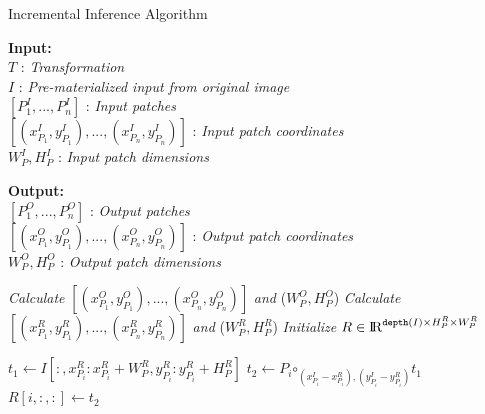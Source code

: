 \begin{algorithm}
    \caption{Incremental Inference Algorithm}\label{euclid}
    \begin{flushleft}
     \hspace*{4mm} \textbf{Input:} \\
     \hspace*{8mm} $T$ : \textit{Transformation}\\
     \hspace*{8mm} $I$ : \textit{Pre-materialized input from original image}\\
     \hspace*{8mm} $[P^I_1,...,P^I_n]$ : \textit{Input patches}\\
     \hspace*{8mm} $[(x^I_{P_1},y^I_{P_1}),...,(x^I_{P_n},y^I_{P_n})]$ : \textit{Input patch coordinates}\\
     \hspace*{8mm} $W^I_P,H^I_P$ : \textit{Input patch dimensions}
    \end{flushleft}

	\begin{flushleft}
     \hspace*{4mm} \textbf{Output:}\\
     \hspace*{8mm} $[P^O_1,...,P^O_n]$ : \textit{Output patches}\\
     \hspace*{8mm} $[(x^O_{P_1},y^O_{P_1}),...,(x^O_{P_n},y^O_{P_n})]$ : \textit{Output patch coordinates}\\
     \hspace*{8mm} $W^O_P,H^O_P$ : \textit{Output patch dimensions}
    \end{flushleft}

    \begin{algorithmic}[1]
    \State \textit{Calculate} $[(x^O_{P_1},y^O_{P_1}),...,(x^O_{P_n},y^O_{P_n})]$ \textit{and} ($W^O_P,H^O_P$)
    \State \textit{Calculate} $[(x^R_{P_1},y^R_{P_1}),...,(x^R_{P_n},y^R_{P_n})]$ \textit{and} ($W^R_P,H^R_P$)
    \State \textit{Initialize} $R \in \mathcal{\rm I\!R}^{\texttt{depth}(I) \times H^R_P \times W^R_P}$

    	\State $t_1 \gets I[:,x^R_{P_i}:x^R_{P_i}+W^R_P,y^R_{P_i}:y^R_{P_i}+H^R_P]$ 
    	\State $t_2 \gets P_i \bm\circ_{(x^I_{P_i}-x^R_{P_i}),(y^I_{P_i}-y^R_{P_i})} t_1$
    	\State $R[i,:,:] \gets t_2$
    \EndFor


\end{algorithmic}
\end{algorithm}
